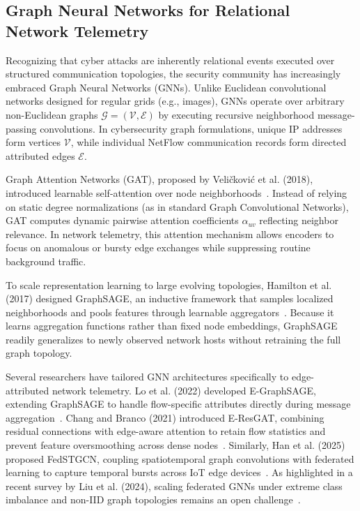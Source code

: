 \documentclass[12pt,a4paper]{report}
\begin{document}
\subsection{Graph Neural Networks for Relational Network Telemetry}
Recognizing that cyber attacks are inherently relational events executed over structured communication topologies, the security community has increasingly embraced Graph Neural Networks (GNNs). Unlike Euclidean convolutional networks designed for regular grids (e.g., images), GNNs operate over arbitrary non-Euclidean graphs $\mathcal{G} = (\mathcal{V}, \mathcal{E})$ by executing recursive neighborhood message-passing convolutions. In cybersecurity graph formulations, unique IP addresses form vertices $\mathcal{V}$, while individual NetFlow communication records form directed attributed edges $\mathcal{E}$.

Graph Attention Networks (GAT), proposed by Veli\v{c}kovi\'{c} et al. (2018), introduced learnable self-attention over node neighborhoods~\cite{velickovic2018gat}. Instead of relying on static degree normalizations (as in standard Graph Convolutional Networks), GAT computes dynamic pairwise attention coefficients $\alpha_{uv}$ reflecting neighbor relevance. In network telemetry, this attention mechanism allows encoders to focus on anomalous or bursty edge exchanges while suppressing routine background traffic.

To scale representation learning to large evolving topologies, Hamilton et al. (2017) designed GraphSAGE, an inductive framework that samples localized neighborhoods and pools features through learnable aggregators~\cite{hamilton2017graphsage}. Because it learns aggregation functions rather than fixed node embeddings, GraphSAGE readily generalizes to newly observed network hosts without retraining the full graph topology.

Several researchers have tailored GNN architectures specifically to edge-attributed network telemetry. Lo et al. (2022) developed E-GraphSAGE, extending GraphSAGE to handle flow-specific attributes directly during message aggregation~\cite{lo2022egraphsage}. Chang and Branco (2021) introduced E-ResGAT, combining residual connections with edge-aware attention to retain flow statistics and prevent feature oversmoothing across dense nodes~\cite{chang2021eresgat}. Similarly, Han et al. (2025) proposed FedSTGCN, coupling spatiotemporal graph convolutions with federated learning to capture temporal bursts across IoT edge devices~\cite{han2025fedstgcn}. As highlighted in a recent survey by Liu et al. (2024), scaling federated GNNs under extreme class imbalance and non-IID graph topologies remains an open challenge~\cite{liu2024fedgnn}.
\end{document}
